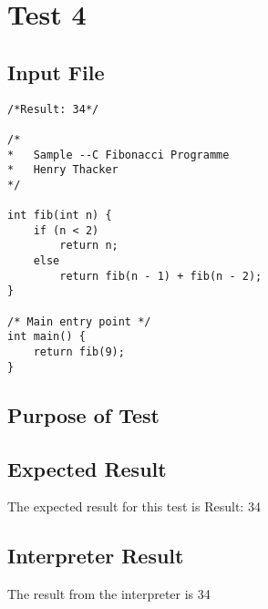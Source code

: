 \section{Test 4}
\subsection{Input File}
\begin{verbatim}
/*Result: 34*/

/*
*	Sample --C Fibonacci Programme
*	Henry Thacker
*/

int fib(int n) {
	if (n < 2) 
		return n;
	else
		return fib(n - 1) + fib(n - 2);
}

/* Main entry point */
int main() {
	return fib(9);
}\end{verbatim}\subsection{Purpose of Test}

\subsection{Expected Result}
The expected result for this test is Result: 34
\subsection{Interpreter Result}
The result from the interpreter is 34
